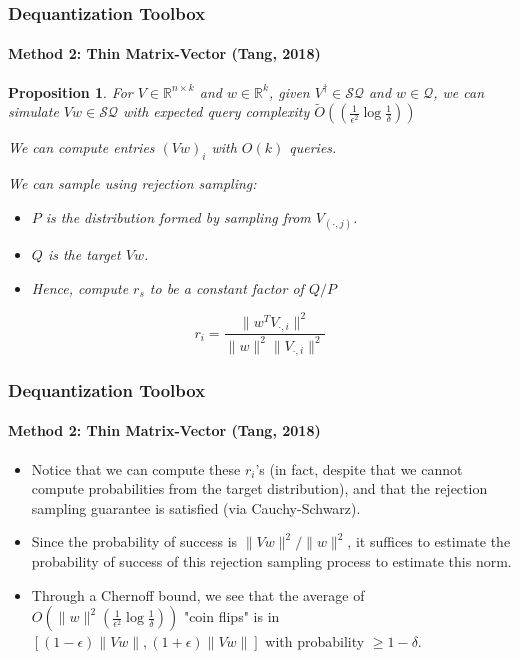 \documentclass{beamer}
\newcommand\0{\mathbf{0}}
\newcommand\RR{\mathbb{R}}
\newcommand\<{\langle}
\renewcommand\>{\rangle}
\newtheorem{proposition}{Proposition}[theorem]
\begin{document}
\begin{frame}
\frametitle{Dequantization Toolbox}
\framesubtitle{Method 2: Thin Matrix-Vector (Tang, 2018)}
\begin{proposition}
	 For $V \in \RR^{n\times k}$ and $w \in \RR^k$, given $V^\dag \in \mathcal{SQ}$ and $w \in \mathcal{Q}$, we can simulate $Vw \in \mathcal{SQ}$ with expected query complexity $\tilde{O}((\frac{1}{\epsilon^2}\log\frac{1}{\delta}))$

We can compute entries $(Vw)_i$ with $O(k)$ queries.

We can sample using rejection sampling:

\begin{itemize}
\item $P$ is the distribution formed by sampling from $V_{(\cdot, j)}$.
  
\item $Q$ is the target $Vw$.
\item Hence, compute $r_s$ to be a constant factor of $Q / P$
\end{itemize}

$$r_i = \frac{\|w^T V_{\cdot, i}\|^2}{\|w\|^2\|V_{\cdot, i}\|^2}$$
\end{proposition}
\end{frame}

\begin{frame}
\frametitle{Dequantization Toolbox}
\framesubtitle{Method 2: Thin Matrix-Vector (Tang, 2018)}
\begin{itemize}
\item Notice that we can compute these $r_i$'s (in fact, despite that we cannot compute probabilities from the target distribution), and that the rejection sampling guarantee is satisfied (via Cauchy-Schwarz).

\item Since the probability of success is $\|Vw\|^2/ \| w\|^2$, it suffices to estimate the probability of success of this rejection sampling process to estimate this norm.

\item Through a Chernoff bound, we see that the average of $O(\|w\|^2(\frac{1}{\epsilon^2}\log\frac{1}{\delta}))$ "coin flips" is in $[(1-\epsilon)\|Vw\|,(1+\epsilon)\|Vw\|]$ with probability $\geq 1-\delta$.
\end{itemize}
\end{frame}
\end{document}
